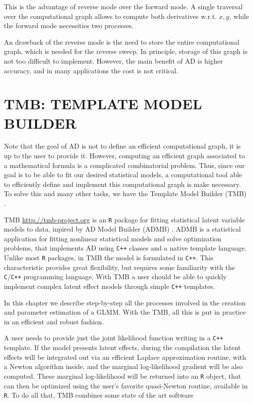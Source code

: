 This is the advantage of reverse mode over the forward mode. A single
traversal over the computational graph allows to compute both
derivatives w.r.t. \(x, y\), while the forward mode necessities two
processes.

An drawback of the reverse mode is the need to store the entire
computational graph, which is needed for the reverse sweep. In
principle, storage of this graph is not too difficult to implement.
However, the main benefit of AD is higher accuracy, and in many
applications the cost is not critical.


\section{TMB: TEMPLATE MODEL BUILDER}
\label{cap:tmb}

Note that the goal of AD is not to define an efficient computational
graph, it is up to the user to provide it. However, computing an
efficient graph associated to a mathematical formula is a complicated
combinatorial problem. Thus, since our goal is to be able to fit our
desired statistical models, a computational tool able to efficiently
define and implement this computational graph is make necessary. To
solve this and many other tasks, we have the Template Model Builder
(TMB) \cite{TMB}.

TMB \url{ http://tmb-project.org} is an \texttt{R} \cite{R18} package
for fitting statistical latent variable models to data, inpired by AD
Model Builder (ADMB) \cite{ADMB}. ADMB is a statistical application for
fitting nonlinear statistical models and solve optimization problems,
that implements AD using \texttt{C++} classes and a native template
language. Unlike most \texttt{R} packages, in TMB the model is
formulated in \texttt{C++}. This characteristic provides great
flexibility, but requires some familiarity with the
\texttt{C}/\texttt{C++} programming language. With TMB a user should be
able to quickly implement complex latent effect models through simple
\texttt{C++} templates.

In this chapter we describe step-by-step all the processes involved in
the creation and parameter estimation of a GLMM. With the TMB, all this
is put in practice in an efficient and robust fashion.

A user needs to provide just the joint likelihood function writing in a
\texttt{C++} template. If the model presents latent effects, during the
compilation the latent effects will be integrated out via an efficient
Laplace approximation routine, with a Newton algorithm inside, and the
marginal log-likelihood gradient will be also computed. These marginal
log-likelihood will be returned into an \texttt{R} object, that can then
be optimized using the user's favorite quasi-Newton routine, available
in \texttt{R}. To do all that, TMB combines some state of the art
software

